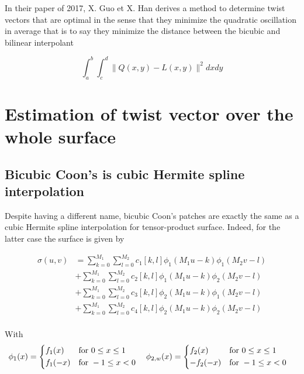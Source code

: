 \documentclass[a4paper, 11pt]{article}
\begin{document}
In their paper of 2017, X. Guo et X. Han derives a method to determine twist vectors that are optimal in the sense that 
they minimize the quadratic oscillation in average that is to say they minimize the distance between the bicubic and 
bilinear interpolant

\begin{equation}
  \int_a^b \int_c^d \|Q(x,y) - L(x,y)\|^2 dxdy
\end{equation}

\section{Estimation of twist vector over the whole surface}

\subsection{Bicubic Coon's is cubic Hermite spline interpolation}

Despite having a different name, bicubic Coon's patches are exactly the same as a cubic Hermite spline interpolation for 
tensor-product surface.  Indeed, for the latter case the surface is given by

\begin{align*}
  \sigma(u,v) &= \sum_{k=0}^{M_1} \sum_{l=0}^{M_2} c_1[k,l] \phi_{1}(M_1u-k)\phi_{1}(M_2v-l) \\
  &+ \sum_{k=0}^{M_1} \sum_{l=0}^{M_2} c_2[k,l] \phi_{1}(M_1u-k)\phi_{2}(M_2v-l) \\
  &+ \sum_{k=0}^{M_1} \sum_{l=0}^{M_2} c_3[k,l] \phi_{2}(M_1u-k)\phi_{1}(M_2v-l) \\
  &+ \sum_{k=0}^{M_1} \sum_{l=0}^{M_2} c_4[k,l] \phi_{2}(M_1u-k)\phi_{2}(M_2v-l) \\
\end{align*}

With 
\begin{align*}
  \phi_{1}(x) =
  \begin{dcases}
    f_{1}(x) &\text{for }  0 \leq x \leq 1 \\
    f_{1}(-x) &\text{for } -1 \leq x < 0\\
  \end{dcases} \quad
  \hfill
  \phi_{2, w}(x) =
  \begin{dcases}
    f_{2}(x) &\text{for }  0 \leq x \leq 1 \\
    -f_{2}(-x) &\text{for } -1 \leq x < 0\\
  \end{dcases} \quad
\end{align*}
\end{document}
